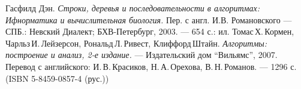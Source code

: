 \begin{thebibliography}{99}
Гасфилд Дэн.
{\itshape Строки, деревья и последовательности в алгоритмах: Ифнорматика и вычислительная биология.}
Пер. с англ. И.В. Романовского --- СПБ.: Невский Диалект; БХВ-Петербург, 2003. --- 654 с.: ил.
Томас\,Х.\,Кормен, Чарльз\,И.\,Лейзерсон, Рональд\,Л.\,Ривест, Клиффорд\,Штайн.
{\itshape Алгоритмы: построение и анализ, 2-е издание.} --- Издательский дом \enquote{Вильямс}, 2007. Перевод с английского: И.\,В.\,Красиков, Н.\,А.\,Орехова, В.\,Н.\,Романов. --- 1296 с. (ISBN 5-8459-0857-4 (рус.))
\end{thebibliography}
\pagebreak


